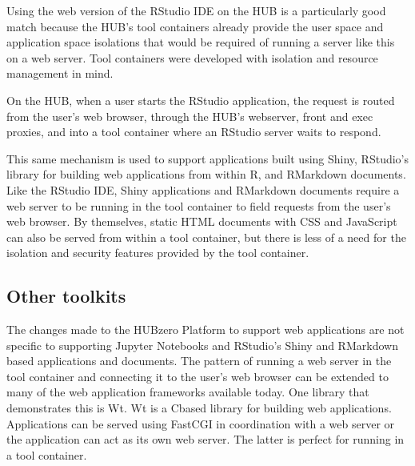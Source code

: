 \documentclass[conference]{../sty/IEEEtran}
\newcommand\CC{C\nolinebreak[4]\hspace{-.05em}\raisebox{.4ex}{\relsize{-3}{\textbf{++}}}\hspace{.25em}}
\begin{document}
Using the web version of the RStudio IDE on the HUB is a particularly good
match because the HUB's tool containers already provide the user space and
application space isolations that would be required of running a server like
this on a web server. Tool containers were developed with isolation and
resource management in mind.

On the HUB, when a user starts the RStudio application, the request is routed
from the user's web browser, through the HUB's webserver, front and exec
proxies, and into a tool container where an RStudio server waits to respond.

This same mechanism is used to support applications built using Shiny,
RStudio's library for building web applications from within R, and RMarkdown
documents. Like the RStudio IDE, Shiny applications and RMarkdown documents
require a web server to be running in the tool container to field requests from
the user's web browser. By themselves, static HTML documents with CSS and JavaScript
can also be served from within a tool container, but there is less of a need
for the isolation and security features provided by the tool container.



\subsection {Other toolkits}

The changes made to the HUBzero Platform to support web applications are not
specific to supporting Jupyter Notebooks and RStudio's Shiny and RMarkdown
based applications and documents. The pattern of running a web server in the
tool container and connecting it to the user's web browser can be extended to
many of the web application frameworks available today. One library that
demonstrates this is Wt\cite{wt}. Wt is a \CC based library for building web
applications. Applications can be served using FastCGI in coordination with a
web server or the application can act as its own web server. The latter is
perfect for running in a tool container.

\end{document}
